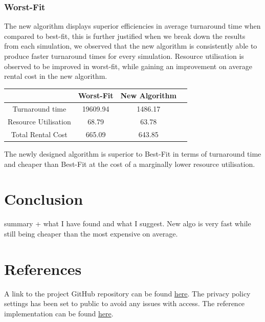 \documentclass[a4paper]{article}
\begin{document}
\subsubsection*{Worst-Fit}
The new algorithm displays superior efficiencies in average turnaround time when compared to best-fit, this is further justified when we break down the results from each simulation, we observed that the new algorithm is consistently able to produce faster turnaround times for every simulation. Resource utilisation is observed to be improved in worst-fit, while gaining an improvement on average rental cost in the new algorithm.

\begin{center}
\begin{tabular}{|c|c|c|c|} 
 \hline
   & Worst-Fit & New Algorithm \\ [0.5ex] 
 \hline
 Turnaround time & 19609.94 & 1486.17 \\ 
 \hline
 Resource Utilisation & 68.79 & 63.78 \\
 \hline
 Total Rental Cost & 665.09 & 643.85 \\
 \hline
\end{tabular}
\end{center}

The newly designed algorithm is superior to Best-Fit in terms of turnaround time and cheaper than Best-Fit at the cost of a marginally lower resource utilisation.

\section{Conclusion}
summary + what I have found and what I suggest.
New algo is very fast while still being cheaper than the most expensive on average. 

\section{References}
A link to the project GitHub repository can be found \href{https://github.com/shakeel-mohammed/client-server}{here}.
The privacy policy settings has been set to public to avoid any issues with access. The reference implementation can be found \href{https://github.com/distsys-MQ/ds-sim}{here}.



\end{document}
